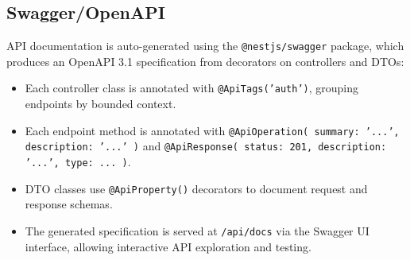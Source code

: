 \subsection{Swagger/OpenAPI}
\label{subsec:app-swagger}

API documentation is auto-generated using the \texttt{@nestjs/swagger} package, which produces an OpenAPI 3.1 specification from decorators on controllers and DTOs:

\begin{itemize}
  \item Each controller class is annotated with \texttt{@ApiTags('auth')}, grouping endpoints by bounded context.
  \item Each endpoint method is annotated with \texttt{@ApiOperation({ summary: '...', description: '...' })} and \texttt{@ApiResponse({ status: 201, description: '...', type: ... })}.
  \item DTO classes use \texttt{@ApiProperty()} decorators to document request and response schemas.
  \item The generated specification is served at \texttt{/api/docs} via the Swagger UI interface, allowing interactive API exploration and testing.
\end{itemize}

